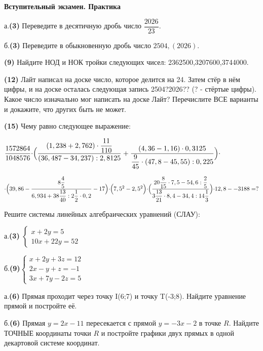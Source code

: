 \centerline{\bf \Huge Вступительный экзамен. Практика}

 а.\textbf{(3)} Переведите в десятичную дробь число $\dfrac{2026}{23}$.

б.\textbf{(3)} Переведите в обыкновенную дробь число $2504,(2026)$.


\textbf{(9)} Найдите НОД и НОК тройки следующих чисел: 2362500,3207600,3744000.

\textbf{(12)} Лайт написал на доске число, которое делится на 24. Затем стёр в нём цифры, и на доске осталась следующая запись 2504?2026?? (? - стёртые цифры). Какое число изначально мог написать на доске Лайт? Перечислите ВСЕ варианты и докажите, что других быть не может.

\textbf{(15)} Чему равно следующее выражение: 

$\dfrac{1572864}{1048576}\cdot\Bigr(\dfrac{(1,238+2,762) \cdot \dfrac{11}{110}}{(36,487-34,237): 2,8125}+\dfrac{(4,36-1,16) \cdot 0,3125}{\dfrac{9}{45} \cdot(47,8-45,55): 0,225}\Bigl)\cdot$ 

$\cdot \Bigr(39,86-\dfrac{8 \dfrac{4}{5}}{6,934+38 \dfrac{13}{40}: 2 \dfrac{1}{2} \cdot 0,2}-17\Bigl)\cdot\Bigr(7,5^2-2,5^2\Bigl)\cdot\Bigr(\dfrac{20\dfrac{8}{15}\cdot7,5-54,6:\dfrac{2}{5}}{3\dfrac{13}{21}\cdot8,4-34,4:14\dfrac{1}{3}}\Bigl)\cdot12,8--3188=?$

 Решите системы линейных алгебраических уравнений (СЛАУ):

а.\textbf{(3)} $ \begin{cases}
   x + 2y = 5
   \\
   10x + 22y = 52
 \end{cases}$


б.\textbf{(9)}$\begin{cases}
   x + 2y + 3z = 12
   \\
   2x - y + z = -1
   \\
   3x + 7y - 2z = 5
   
 \end{cases}$

а.\textbf{(6)} Прямая проходит через точку I(6;7) и точку T(-3;8). Найдите уравнение прямой и постройте её.

б.\textbf{(6)} Прямая $y=2x-11$ пересекается с прямой $y=-3x-2$ в точке $R$. Найдите ТОЧНЫЕ координаты точки $R$ и постройте графики двух прямых в одной декартовой системе координат.

